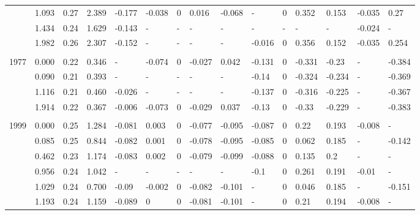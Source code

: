 \documentclass[]{article}
\begin{document}
\begin{table}[!h]
{\begin{tabular}{lrrrlllllllllll}
\hspace{1em} & 1.093 & 0.27 & 2.389 & -0.177 & -0.038 & 0 & 0.016 & -0.068 & - & 0 & 0.352 & 0.153 & -0.035 & 0.27\\
\hspace{1em} & 1.434 & 0.24 & 1.629 & -0.143 & - & - & - & - & - & - & - & - & -0.024 & -\\
\hspace{1em} & 1.982 & 0.26 & 2.307 & -0.152 & - & - & - & - & -0.016 & 0 & 0.356 & 0.152 & -0.035 & 0.254\\
\addlinespace[.4em]
\hline
\multicolumn{1}{l}{\textbf{}}\\
\hspace{1em}1977 & 0.000 & 0.22 & 0.346 & - & -0.074 & 0 & -0.027 & 0.042 & -0.131 & 0 & -0.331 & -0.23 & - & -0.384\\
\hspace{1em} & 0.090 & 0.21 & 0.393 & - & - & - & - & - & -0.14 & 0 & -0.324 & -0.234 & - & -0.369\\
\hspace{1em} & 1.116 & 0.21 & 0.460 & -0.026 & - & - & - & - & -0.137 & 0 & -0.316 & -0.225 & - & -0.367\\
\hspace{1em} & 1.914 & 0.22 & 0.367 & -0.006 & -0.073 & 0 & -0.029 & 0.037 & -0.13 & 0 & -0.33 & -0.229 & - & -0.383\\
\addlinespace[.4em]
\hline
\multicolumn{1}{l}{\textbf{}}\\
\hspace{1em}1999 & 0.000 & 0.25 & 1.284 & -0.081 & 0.003 & 0 & -0.077 & -0.095 & -0.087 & 0 & 0.22 & 0.193 & -0.008 & -\\
\hspace{1em} & 0.085 & 0.25 & 0.844 & -0.082 & 0.001 & 0 & -0.078 & -0.095 & -0.085 & 0 & 0.062 & 0.185 & - & -0.142\\
\hspace{1em} & 0.462 & 0.23 & 1.174 & -0.083 & 0.002 & 0 & -0.079 & -0.099 & -0.088 & 0 & 0.135 & 0.2 & - & -\\
\hspace{1em} & 0.956 & 0.24 & 1.042 & - & - & - & - & - & -0.1 & 0 & 0.261 & 0.191 & -0.01 & -\\
\hspace{1em} & 1.029 & 0.24 & 0.700 & -0.09 & -0.002 & 0 & -0.082 & -0.101 & - & 0 & 0.046 & 0.185 & - & -0.151\\
\hspace{1em} & 1.193 & 0.24 & 1.159 & -0.089 & 0 & 0 & -0.081 & -0.101 & - & 0 & 0.21 & 0.194 & -0.008 & -\\

\end{tabular}}
\end{table}
\end{document}
